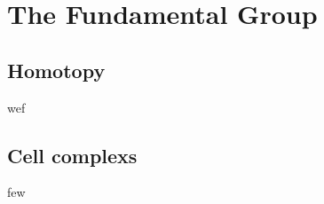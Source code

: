 \documentclass[11pt]{article}
\theoremstyle{definition}
\theoremstyle{plain}
\theoremstyle{remark}
\begin{document}
\tableofcontents
\chapter{The Fundamental Group}
\section{Homotopy}

wef


\section{Cell complexs}


few
\end{document}
